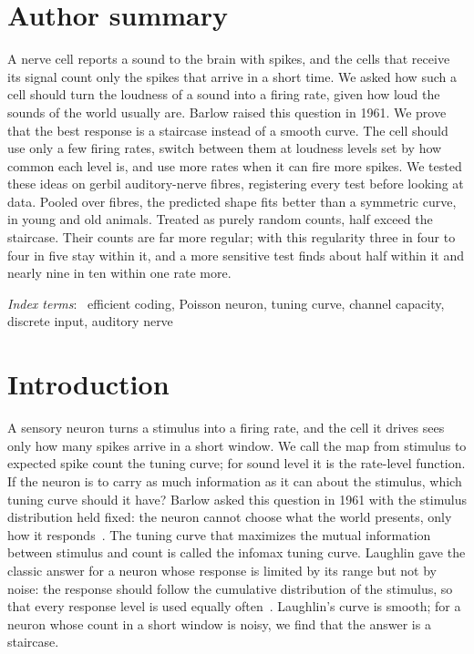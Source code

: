 \documentclass[10pt,letterpaper]{article}
\newenvironment{IEEEkeywords}{\par\noindent\textit{Index terms}:\ }{\par}
\begin{document}
\section*{Author summary}
A nerve cell reports a sound to the brain with spikes, and the cells that receive its signal count only the spikes that arrive in a short time. We asked how such a cell should turn the loudness of a sound into a firing rate, given how loud the sounds of the world usually are. Barlow raised this question in 1961. We prove that the best response is a staircase instead of a smooth curve. The cell should use only a few firing rates, switch between them at loudness levels set by how common each level is, and use more rates when it can fire more spikes. We tested these ideas on gerbil auditory-nerve fibres, registering every test before looking at data. Pooled over fibres, the predicted shape fits better than a symmetric curve, in young and old animals. Treated as purely random counts, half exceed the staircase. Their counts are far more regular; with this regularity three in four to four in five stay within it, and a more sensitive test finds about half within it and nearly nine in ten within one rate more.

\begin{IEEEkeywords}
efficient coding, Poisson neuron, tuning curve, channel capacity, discrete input, auditory nerve
\end{IEEEkeywords}


\clearpage
{}
\linenumbers

\section{Introduction}\label{sec:intro}

A sensory neuron turns a stimulus into a firing rate, and the cell it drives sees only how many spikes arrive in a short window. We call
the map from stimulus to expected spike count the tuning curve; for sound level it is the rate-level function. If the neuron is to
carry as much information as it can about the stimulus, which tuning curve should it have? Barlow asked this question in 1961 with the
stimulus distribution held fixed: the neuron cannot choose what the world presents, only how it responds~\cite{Barlow1961}. The tuning
curve that maximizes the mutual information between stimulus and count is called the infomax tuning curve. Laughlin gave the classic
answer for a neuron whose response is limited by its range but not by noise: the response should follow the cumulative distribution of
the stimulus, so that every response level is used equally often~\cite{Laughlin1981}. Laughlin's curve is smooth; for a neuron
whose count in a short window is noisy, we find that the answer is a staircase.
\end{document}
